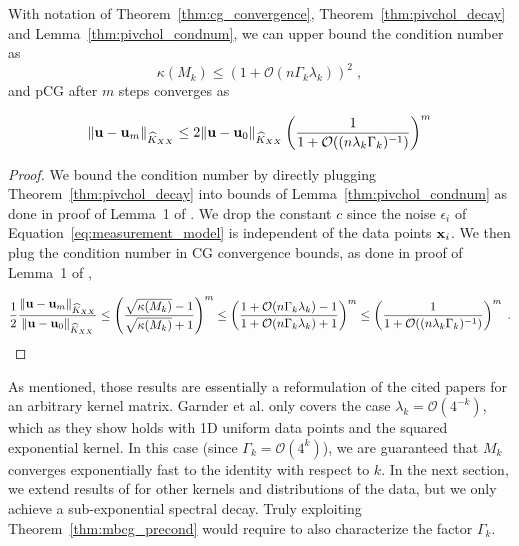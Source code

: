 \documentclass{article}
\begin{document}
\begin{theorem}\label{thm:mbcg_precond}
With notation of Theorem~\ref{thm:cg_convergence},  Theorem~\ref{thm:pivchol_decay} and Lemma~\ref{thm:pivchol_condnum}, we can upper bound the condition number as
\begin{equation*}
    \kappa \left( M_k \right) \le (1 + \mathcal O(n \Gamma_k \lambda_k) )^2 \; ,
\end{equation*}
%
and pCG after $m$ steps converges as 

\begin{equation*}
    \Vert \boldsymbol{\mathbf{u}} - \boldsymbol{\mathbf{u}}_m \Vert_{\widehat K_{XX}} 
    \le 2 \Vert \boldsymbol{\mathbf{u}} - \boldsymbol{\mathbf{u}}_0 \Vert_{\widehat K_{XX}} \left(\frac{1}{1 + \mathcal O((n \lambda_k \Gamma_k)^{-1}) } \right)^m 
\end{equation*}
\end{theorem}
\begin{proof}
We bound the condition number by directly plugging Theorem~\ref{thm:pivchol_decay} into bounds of Lemma~\ref{thm:pivchol_condnum} as done in proof of Lemma~1 of \cite{gardner_gpytorch_2021}. We drop the constant $c$ since the noise $\epsilon_i$ of Equation~\eqref{eq:measurement_model} is independent of the data points $\boldsymbol{\mathbf{x}}_i$.
We then plug the condition number in CG convergence bounds, as done in proof of Lemma~1 of \cite{gardner_gpytorch_2021},

\begin{equation*}
    \frac 1 2 \frac{ \Vert \boldsymbol{\mathbf{u}} - \boldsymbol{\mathbf{u}}_m \Vert_{\widehat K_{XX}} }{ \Vert \boldsymbol{\mathbf{u}} - \boldsymbol{\mathbf{u}}_0 \Vert_{\widehat K_{XX}} }
    \le \left(  \frac{\sqrt{\kappa(M_k)} - 1}{\sqrt{ \kappa(M_k)} + 1} \right)^m \le \left(  \frac{1 + \mathcal O(n \Gamma_k \lambda_k) - 1}{1 + \mathcal O(n \Gamma_k \lambda_k) + 1} \right)^m
    \le \left(\frac{1}{1 + \mathcal O((n \lambda_k \Gamma_k)^{-1}) } \right)^m  \;.
\end{equation*}
\end{proof}


\begin{remark}
As mentioned, those results are essentially a reformulation of the cited papers for an arbitrary kernel matrix. Garnder et al. \cite{gardner_gpytorch_2021} only covers the case $\lambda_k = \mathcal O(4^{-k})$, which as they show holds with 1D uniform data points and the squared exponential kernel. In this case (since $\Gamma_k = \mathcal O(4^k)$), we are guaranteed that $M_k$ converges exponentially fast to the identity with respect to $k$. In the next section, we extend results of \cite{gardner_gpytorch_2021} for other kernels and distributions of the data, but we only achieve a sub-exponential spectral decay. Truly exploiting Theorem~\ref{thm:mbcg_precond} would require to also characterize the factor $\Gamma_k$.
\end{remark}
\end{document}
